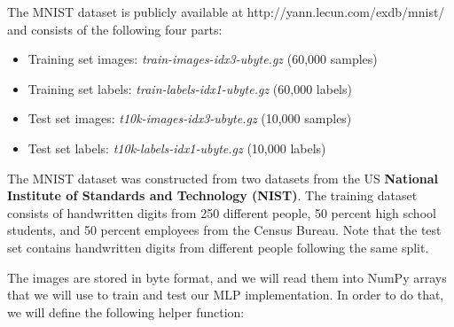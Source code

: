\documentclass[11pt]{article}
\providecommand{\tightlist}{%
      \setlength{\itemsep}{0pt}\setlength{\parskip}{0pt}}
\begin{document}
    The MNIST dataset is publicly available at
http://yann.lecun.com/exdb/mnist/ and consists of the following four
parts:

\begin{itemize}
\tightlist
\item
  Training set images: \emph{train-images-idx3-ubyte.gz} (60,000
  samples)
\item
  Training set labels: \emph{train-labels-idx1-ubyte.gz} (60,000 labels)
\item
  Test set images: \emph{t10k-images-idx3-ubyte.gz} (10,000 samples)
\item
  Test set labels: \emph{t10k-labels-idx1-ubyte.gz} (10,000 labels)
\end{itemize}

The MNIST dataset was constructed from two datasets from the US
\textbf{National Institute of Standards and Technology (NIST)}. The
training dataset consists of handwritten digits from 250 different
people, 50 percent high school students, and 50 percent employees from
the Census Bureau. Note that the test set contains handwritten digits
from different people following the same split.

The images are stored in byte format, and we will read them into NumPy
arrays that we will use to train and test our MLP implementation. In
order to do that, we will define the following helper function:
\end{document}
